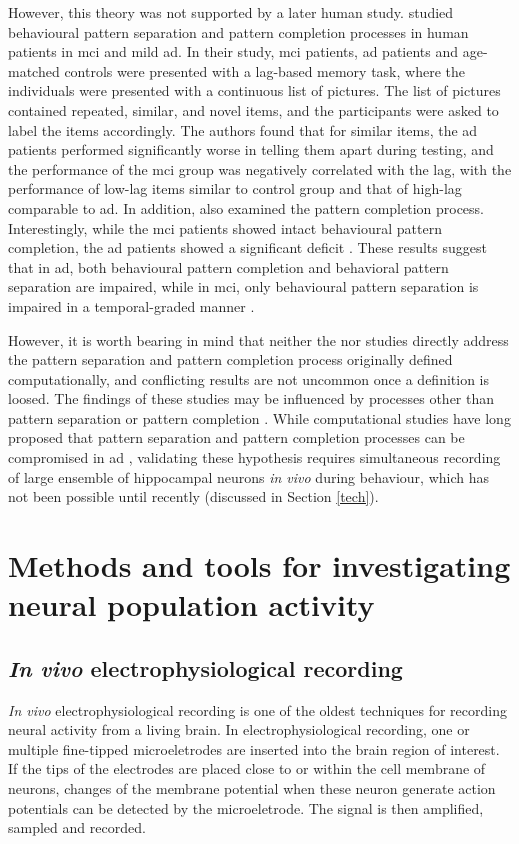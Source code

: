 However, this theory was not supported by a later human study. \citet{ally13} studied behavioural pattern separation and pattern completion processes in human patients in \gls{mci} and mild \gls{ad}. In their study, \gls{mci} patients, \gls{ad} patients and age-matched controls were presented with a lag-based memory task, where the individuals were presented with a continuous list of pictures. The list of pictures contained repeated, similar, and novel items, and the participants were asked to label the items accordingly. The authors found that for similar items, the \gls{ad} patients performed significantly worse in telling them apart during testing, and the performance of the \gls{mci} group was negatively correlated with the lag, with the performance of low-lag items similar to control group and that of high-lag comparable to \gls{ad}.  In addition, \citet{ally13} also examined the pattern completion process. Interestingly, while the \gls{mci} patients showed intact behavioural pattern completion, the \gls{ad} patients showed a significant deficit \citep{ally13}. These results suggest that in \gls{ad}, both behavioural pattern completion and behavioral pattern separation are impaired, while in \gls{mci}, only behavioural pattern separation is impaired in a temporal-graded manner \citep{ally13}.

However, it is worth bearing in mind that neither the \citet{palmer11} nor \citet{ally13} studies directly address the pattern separation and pattern completion process originally defined computationally, and conflicting results are not uncommon once a definition is loosed.  The findings of these studies may be influenced by processes other than pattern separation or pattern completion \citep{santoro13}. While computational studies have long proposed that pattern separation and pattern completion processes can be compromised in \gls{ad} \citep{horn93, hasselmo94, hasselmo97}, validating these hypothesis requires simultaneous recording of large ensemble of hippocampal neurons \textit{in vivo} during behaviour, which has not been possible until recently (discussed in Section \ref{tech}).  

\section{Methods and tools for investigating neural population activity \label{tech}}
\subsection{\textit{In vivo} electrophysiological recording}
\textit{In vivo} electrophysiological recording is one of the oldest techniques for recording neural activity from a living brain. In electrophysiological recording, one or multiple fine-tipped microeletrodes are inserted into the brain region of interest. If the tips of the electrodes are placed close to or within the cell membrane of neurons, changes of the membrane potential when these neuron generate action potentials can be detected by the microeletrode. The signal is then amplified, sampled and recorded. 

